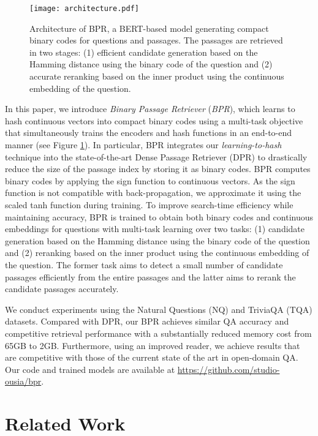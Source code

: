 \documentclass[11pt,a4paper]{article}
\begin{document}
\begin{figure}[t]
  \centering
  \texttt{[image: architecture.pdf]}
  \caption{Architecture of BPR, a BERT-based model generating compact binary codes for questions and passages.
    The passages are retrieved in two stages: (1) efficient candidate generation based on the Hamming distance using the binary code of the question and (2) accurate reranking based on the inner product using the continuous embedding of the question.}
  \label{fig:architecture}
\end{figure}

In this paper, we introduce \textit{Binary Passage Retriever} (\textit{BPR}), which learns to hash continuous vectors into compact binary codes using a multi-task objective that simultaneously trains the encoders and hash functions in an end-to-end manner (see Figure \ref{fig:architecture}).
In particular, BPR integrates our \textit{learning-to-hash} technique into the state-of-the-art Dense Passage Retriever (DPR) \cite{Karpukhin2020DenseAnswering}
to drastically reduce the size of the passage index by storing it as binary codes.
BPR computes binary codes by applying the sign function to continuous vectors.
As the sign function is not compatible with back-propagation, we approximate it using the scaled tanh function during training.
To improve search-time efficiency while maintaining accuracy,  BPR is trained to obtain both binary codes and continuous embeddings for questions with multi-task learning over two tasks:
(1) candidate generation based on the Hamming distance using the binary code of the question and (2) reranking based on the inner product using the continuous embedding of the question.
The former task aims to detect a small number of candidate passages efficiently from the entire passages and the latter aims to rerank the candidate passages accurately.

We conduct experiments using the Natural Questions (NQ) \cite{doi:10.1162/tacl_a_00276} and TriviaQA (TQA) \cite{Joshi2017TriviaQA:Comprehension} datasets.
Compared with DPR, our BPR achieves similar QA accuracy and competitive retrieval performance with a substantially reduced memory cost from 65GB to 2GB.
Furthermore, using an improved reader, we achieve results that are competitive with those of the current state of the art in open-domain QA. 
Our code and trained models are available at \url{https://github.com/studio-ousia/bpr}.

\section{Related Work}
\end{document}
